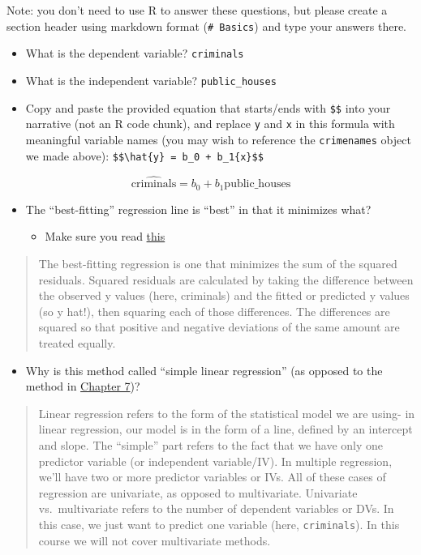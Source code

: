\documentclass[]{article}
\providecommand{\tightlist}{%
  \setlength{\itemsep}{0pt}\setlength{\parskip}{0pt}}
\begin{document}
Note: you don't need to use R to answer these questions, but please
create a section header using markdown format (\texttt{\#\ Basics}) and
type your answers there.

\begin{itemize}
\tightlist
\item
  What is the dependent variable? \texttt{criminals}
\item
  What is the independent variable? \texttt{public\_houses}
\item
  Copy and paste the provided equation that starts/ends with
  \texttt{\$\$} into your narrative (not an R code chunk), and replace
  \texttt{y} and \texttt{x} in this formula with meaningful variable
  names (you may wish to reference the \texttt{crimenames} object we
  made above):
  \texttt{\$\$\textbackslash{}hat\{y\}\ =\ b\_0\ +\ b\_1\{x\}\$\$}
\end{itemize}

\[\hat{\textrm{criminals}} = b_0 + b_1{\textrm{public_houses}}\]

\begin{itemize}
\tightlist
\item
  The ``best-fitting'' regression line is ``best'' in that it minimizes
  what?

  \begin{itemize}
  \tightlist
  \item
    Make sure you read
    \href{http://moderndive.netlify.com/6-regression.html\#leastsquares}{this}
  \end{itemize}
\end{itemize}

\begin{quote}
The best-fitting regression is one that minimizes the sum of the squared
residuals. Squared residuals are calculated by taking the difference
between the observed y values (here, criminals) and the fitted or
predicted y values (so y hat!), then squaring each of those differences.
The differences are squared so that positive and negative deviations of
the same amount are treated equally.
\end{quote}

\begin{itemize}
\tightlist
\item
  Why is this method called ``simple linear regression'' (as opposed to
  the method in
  \href{http://moderndive.netlify.com/7-multiple-regression.html}{Chapter
  7})?
\end{itemize}

\begin{quote}
Linear regression refers to the form of the statistical model we are
using- in linear regression, our model is in the form of a line, defined
by an intercept and slope. The ``simple'' part refers to the fact that
we have only one predictor variable (or independent variable/IV). In
multiple regression, we'll have two or more predictor variables or IVs.
All of these cases of regression are univariate, as opposed to
multivariate. Univariate vs.~multivariate refers to the number of
dependent variables or DVs. In this case, we just want to predict one
variable (here, \texttt{criminals}). In this course we will not cover
multivariate methods.
\end{quote}
\end{document}
